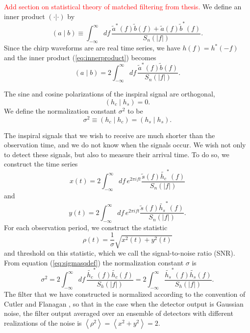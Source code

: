 \textcolor{red}{Add section on statistical theory of matched filtering from
thesis.} We define an inner product $(\cdot|\cdot)$ by
\begin{equation}
\label{eq:innerproduct}
  (a\mid b) \equiv \int_{-\infty}^\infty df\,
  \frac{\tilde{a}^\ast(f)\tilde{b}(f)+\tilde{a}(f)\tilde{b}^\ast(f)}
       {S_n(|f|)}.
\end{equation}
Since the chirp waveforms are are real time series, we have $h(f) =
h^\ast(-f)$ and the inner product (\ref{eq:innerproduct}) becomes
\begin{equation}
\left(a\mid b\right) = 2 \int_{-\infty}^{\infty}df\,
\frac{\tilde{a}^\ast(f)\tilde{b}(f)}{S_n\left(\left|f\right|\right)}.
\end{equation}

The sine and cosine polarizations of the inspiral signal are orthogonal,
\begin{equation}
\left(h_c\mid h_s\right) = 0.
\end{equation}
We define the normalization constant $\sigma^2$ to be
\begin{equation}
\sigma^2 \equiv \left(h_c\mid h_c\right) = \left(h_s\mid h_s\right).
\label{eq:sigmasqdef}
\end{equation}

The inspiral signals that we wish to receive are much shorter than the
observation time, and we do not know when the signals occur. We wish not only
to detect these signals, but also to measure their arrival time. To do so, we
construct the time series
\begin{equation}
\label{eq:xcts}
x(t) = 2 \int_{-\infty}^{\infty}df\,e^{2\pi i f t} 
\frac{\tilde{s}(f) \tilde{h_c}^\ast(f)}{S_n\left(\left|f\right|\right)}
\end{equation}
and
\begin{equation}
\label{eq:ycts}
y(t) = 2 \int_{-\infty}^{\infty}df\,e^{2\pi i f t} 
\frac{\tilde{s}(f) \tilde{h_s}^\ast(f)}{S_n\left(\left|f\right|\right)}.
\end{equation}
For each observation period, we construct the statistic
\begin{equation}
\rho(t) = \frac{1}{\sigma}\sqrt{x^2(t) + y^2(t)}
\label{eq:rhosqcts}
\end{equation}
and threshold on this statistic, which we call the signal-to-noise ratio
(SNR). From equation (\ref{eq:sigmasqdef}) the normalization constant $\sigma$ is
\begin{equation}
\label{eq:sigmasqcts}
\sigma^2 = 2 \int_{-\infty}^{\infty}df\,
\frac{\tilde{h_c}^\ast(f)\tilde{h_c}(f)}{S_h\left(\left|f\right|\right)} 
= 2 \int_{-\infty}^\infty 
\frac{\tilde{h_s}^\ast(f)\tilde{h_s}(f)}{S_h\left(\left|f\right|\right)}.
\end{equation}
The filter that we have constructed is normalized according to the convention
of Cutler and Flanagan \cite{cutflan}, so that in the case when the detector
output is Gaussian noise, the filter output averaged over an ensemble of
detectors with different realizations of the noise is
$\left\langle \rho^2 \right\rangle = \left\langle x^2 + y^2 \right\rangle = 2$.

